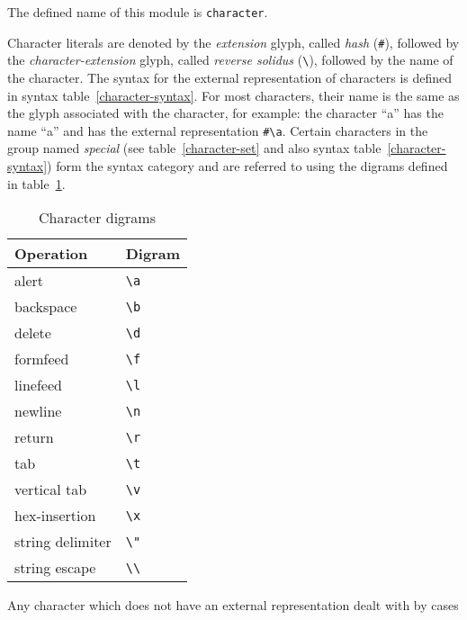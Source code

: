 \label{character}
\begin{optDefinition}
%
The defined name of this module is {\tt character}.

%
Character literals are denoted by the {\em
    extension\/} glyph, called {\em hash} (\verb+#+), followed by the {\em
    character-extension\/}
glyph, called {\em reverse solidus\/} (\verb+\+), followed by the name of the
character.  The syntax for the external representation of characters is defined
in syntax table~\ref{character-syntax}.  For most characters, their name is the
same as the glyph associated with the character, for example: the character
``a'' has the name ``a'' and has the external representation \verb+#\a+.
Certain characters in the group named {\em special\/} (see
table~\ref{character-set} and also syntax table~\ref{character-syntax}) form the
syntax category  and are referred to using the
digrams defined in table~\ref{character-digrams}.
%
\begin{table}[h]
\label{character-digrams}
\caption{Character digrams}%
\begin{center}
\begin{tabular}{|ll|}\hline
    Operation & Digram \\
    \hline
    alert & \verb+\a+ \\
    backspace & \verb+\b+ \\
    delete & \verb+\d+ \\
    formfeed & \verb+\f+ \\
    linefeed & \verb+\l+ \\
    newline & \verb+\n+ \\
    return & \verb+\r+ \\
    tab & \verb+\t+ \\
    vertical tab & \verb+\v+ \\
    hex-insertion & \verb+\x+ \\
    string delimiter & \verb+\"+ \\
    string escape & \verb+\\+ \\
    \hline
\end{tabular}
\end{center}
\end{table}
%
Any character which does not have an external representation dealt with by cases

\end{optDefinition}

